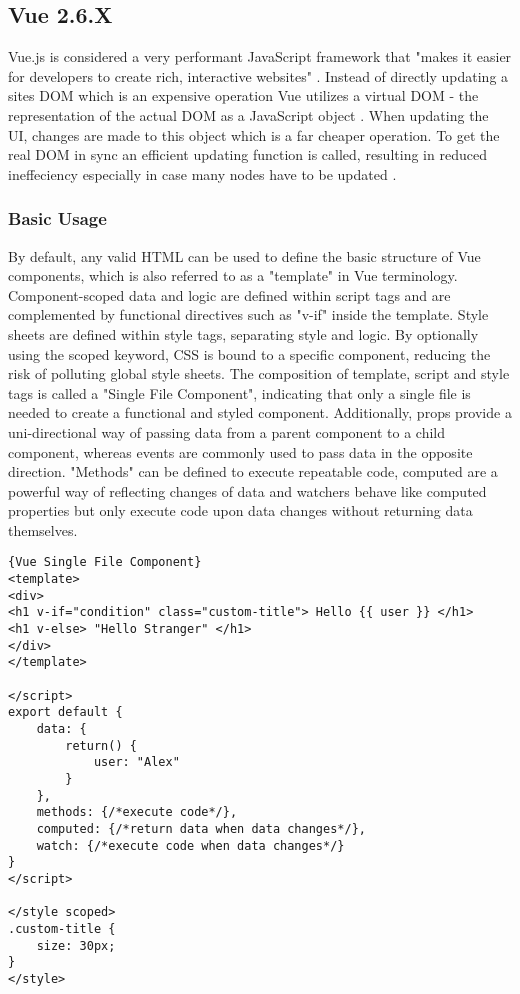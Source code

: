 \subsection{Vue 2.6.X}
Vue.js is considered a very performant JavaScript framework that "makes it easier for developers to create rich, interactive websites" \cite{macrae2018vue}. Instead of directly updating a sites \gls{DOM} which is an expensive operation Vue utilizes a virtual DOM \cite{ComparisonVue:online} - the representation of the actual DOM as a JavaScript object \cite{WhatIsVirtualDom:online}. When updating the UI, changes are made to this object which is a far cheaper operation. To get the real DOM in sync an efficient updating function is called, resulting in reduced ineffeciency especially in case many nodes have to be updated \cite{WhatIsVirtualDom:online}.

\subsubsection{Basic Usage}
 By default, any valid HTML can be used to define the basic structure of Vue components, which is also referred to as a "template" in Vue terminology. Component-scoped data and logic are defined within script tags and are complemented by functional directives such as "v-if" inside the template. Style sheets are defined within style tags, separating style and logic. By optionally using the scoped keyword, CSS is bound to a specific component, reducing the risk of polluting global style sheets. The composition of template, script and style tags is called a "Single File Component", indicating that only a single file is needed to create a functional and styled component. Additionally, props provide a uni-directional way of passing data from a parent component to a child component, whereas events are commonly used to pass data in the opposite direction. "Methods" can be defined to execute repeatable code, \gls{computed} are a powerful way of reflecting changes of data and \gls{watchers} behave like computed properties but only execute code upon data changes without returning data themselves. \newline

\begin{lstlisting}[caption=Vue Single File Component, captionpos=b, style=htmlcssjs]{Vue Single File Component}
<template>
<div>
<h1 v-if="condition" class="custom-title"> Hello {{ user }} </h1>
<h1 v-else> "Hello Stranger" </h1>
</div>
</template>

</script>
export default {
    data: {
        return() {
            user: "Alex"
        }
    },
    methods: {/*execute code*/},
    computed: {/*return data when data changes*/},
    watch: {/*execute code when data changes*/}
}
</script>

</style scoped>
.custom-title {
    size: 30px;
}
</style>
\end{lstlisting}

